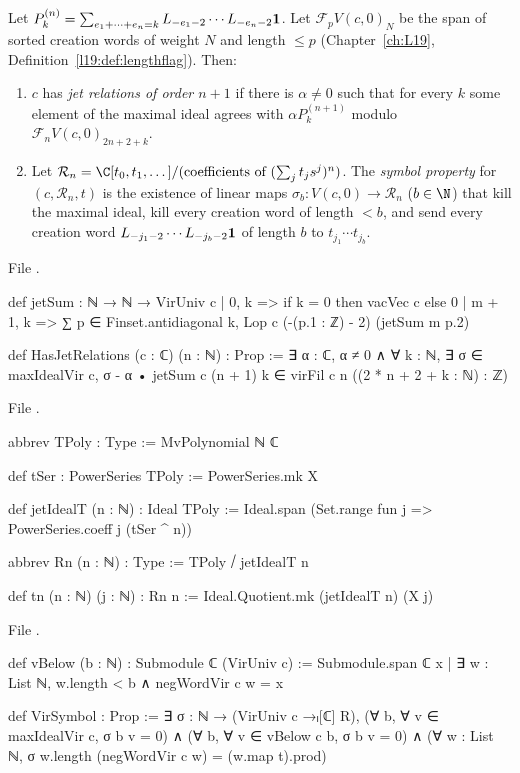 \begin{definition}\label{l20:def:virinputs}
Let $P_k^{(n)}=\sum_{e_1+\dots+e_n=k}L_{-e_1-2}\cdots L_{-e_n-2}\mathbf{1}$. Let $\mathcal F_pV(c,0)_N$ be the span of sorted
creation words of weight $N$ and length $\le p$ (Chapter~\ref{ch:L19}, Definition~\ref{l19:def:lengthflag}). Then:
\begin{enumerate}
\item $c$ has \emph{jet relations of order $n+1$} if there is $\alpha\ne0$ such that for every $k$ some element of the maximal
  ideal agrees with $\alpha P_k^{(n+1)}$ modulo $\mathcal F_nV(c,0)_{2n+2+k}$.
\item Let $\mathcal R_n=\C[t_0,t_1,\dots]/(\text{coefficients of }(\sum_jt_js^j)^n)$. The \emph{symbol property} for $(c,\mathcal R_n,t)$ is the existence
  of linear maps $\sigma_b\colon V(c,0)\to \mathcal R_n$ ($b\in\N$) that kill the maximal ideal, kill every creation word of length $<b$,
  and send every creation word $L_{-j_1-2}\cdots L_{-j_b-2}\mathbf{1}$ of length $b$ to $t_{j_1}\cdots t_{j_b}$.
\end{enumerate}
\end{definition}
\noindent File .
\begin{leancode}
def jetSum : ℕ → ℕ → VirUniv c
  | 0, k => if k = 0 then vacVec c else 0
  | m + 1, k => ∑ p ∈ Finset.antidiagonal k, Lop c (-(p.1 : ℤ) - 2) (jetSum m p.2)

def HasJetRelations (c : ℂ) (n : ℕ) : Prop :=
  ∃ α : ℂ, α ≠ 0 ∧ ∀ k : ℕ, ∃ σ ∈ maxIdealVir c,
    σ - α • jetSum c (n + 1) k ∈ virFil c n ((2 * n + 2 + k : ℕ) : ℤ)
\end{leancode}
\noindent File .
\begin{leancode}
abbrev TPoly : Type := MvPolynomial ℕ ℂ

def tSer : PowerSeries TPoly := PowerSeries.mk X

def jetIdealT (n : ℕ) : Ideal TPoly :=
  Ideal.span (Set.range fun j => PowerSeries.coeff j (tSer ^ n))

abbrev Rn (n : ℕ) : Type := TPoly ⧸ jetIdealT n

def tn (n : ℕ) (j : ℕ) : Rn n := Ideal.Quotient.mk (jetIdealT n) (X j)
\end{leancode}
\noindent File .
\begin{leancode}
def vBelow (b : ℕ) : Submodule ℂ (VirUniv c) :=
  Submodule.span ℂ {x | ∃ w : List ℕ, w.length < b ∧ negWordVir c w = x}

def VirSymbol : Prop :=
  ∃ σ : ℕ → (VirUniv c →ₗ[ℂ] R),
    (∀ b, ∀ v ∈ maxIdealVir c, σ b v = 0) ∧
    (∀ b, ∀ v ∈ vBelow c b, σ b v = 0) ∧
    (∀ w : List ℕ, σ w.length (negWordVir c w) = (w.map t).prod)
\end{leancode}

